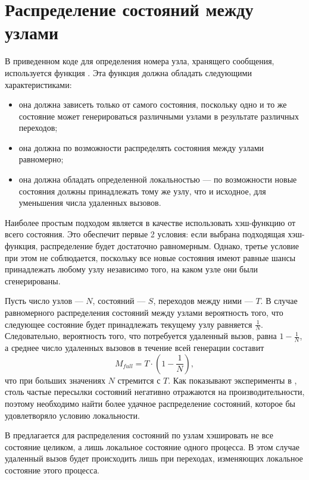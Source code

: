 \section{Распределение состояний между узлами}
\label{sec:state-partition}

В приведенном коде для определения номера узла, хранящего сообщения,
используется функция . Эта функция должна обладать следующими
характеристиками:

\begin{itemize}
\item она должна зависеть только от самого состояния, поскольку одно и
  то же состояние может генерироваться различными узлами в результате
  различных переходов;

\item она должна по возможности распределять состояния между узлами
  равномерно;

\item она должна обладать определенной локальностью — по возможности
  новые состояния должны принадлежать тому же узлу, что и исходное,
  для уменьшения числа удаленных вызовов.
\end{itemize}

Наиболее простым подходом является в качестве  использовать
хэш-функцию от всего состояния. Это обеспечит первые 2 условия: если
выбрана подходящая хэш-функция, распределение будет достаточно
равномерным. Однако, третье условие при этом не соблюдается, поскольку
все новые состояния имеют равные шансы принадлежать любому узлу
независимо того, на каком узле они были сгенерированы.

Пусть число узлов — $N$, состояний — $S$, переходов между ними —
$T$. В случае равномерного распределения состояний между узлами
вероятность того, что следующее состояние будет принадлежать текущему
узлу равняется $\frac{1}{N}$. Следовательно, вероятность того, что
потребуется удаленный вызов, равна $1 - \frac{1}{N}$, а среднее число
удаленных вызовов в течение всей генерации составит
\begin{equation}
  \label{eq:nmsg-full-hash}
  M_{full} = T \cdot (1 - \frac{1}{N}) ,
\end{equation}
что при больших значениях $N$ стремится с $T$. Как
показывают эксперименты в \cite{LT99}, столь частые пересылки
состояний негативно отражаются на производительности, поэтому
необходимо найти более удачное распределение состояний, которое бы
удовлетворяло условию локальности.

В \cite{LT99} предлагается для распределения состояний по узлам
хэшировать не все состояние целиком, а лишь локальное состояние одного
процесса. В этом случае удаленный вызов будет происходить лишь при
переходах, изменяющих локальное состояние этого процесса.

